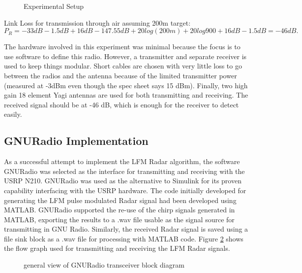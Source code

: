 \documentclass[letterpaper, 12 pt, conference]{report}
\numberwithin{figure}{section}
\begin{document}
\begin{figure}[h]
\centering{}
\caption{Experimental Setup}
\label{fig:towerex}
\end{figure}

Link Loss for transmission through air assuming 200m target: 
\[P_{R} = -33dB-1.5dB+16dB-147.55dB+20log(200m)+20log900+16dB-1.5dB = -46dB.\]
 
The hardware involved in this experiment was minimal because the focus is to use software to define this radio. However, a transmitter and separate receiver is used to keep things modular. Short cables are chosen with very little loss to go between the radios and the antenna because of the limited transmitter power (measured at -3dBm even though the spec sheet says 15 dBm). Finally, two high gain 18 element Yagi antennas are used for both transmitting and receiving. The received signal should be at -46 dB, which is enough for the receiver to detect easily.

\subsection{GNURadio Implementation}
As a successful attempt to implement the LFM Radar algorithm, the software GNURadio was selected as the interface for transmitting and receiving with the USRP N210.  GNURadio was used as the alternative to Simulink for its proven capability interfacing with the USRP hardware. The code initially developed for generating the LFM pulse modulated Radar signal had been developed using MATLAB. GNURadio supported the re-use of the chirp signals generated in MATLAB, exporting the results to a .wav file usable as the signal source for transmitting in GNU Radio. Similarly, the received Radar signal is saved using a file sink block as a .wav file for processing with MATLAB code. Figure \ref{fig:gnufgsimp} shows the flow graph used for transmitting and receiving the LFM Radar signals.
\newline
\begin{figure}[h]
\centering{}
\caption{general view of GNURadio transceiver block diagram}
\label{fig:gnufgsimp}
\end{figure}
\end{document}
